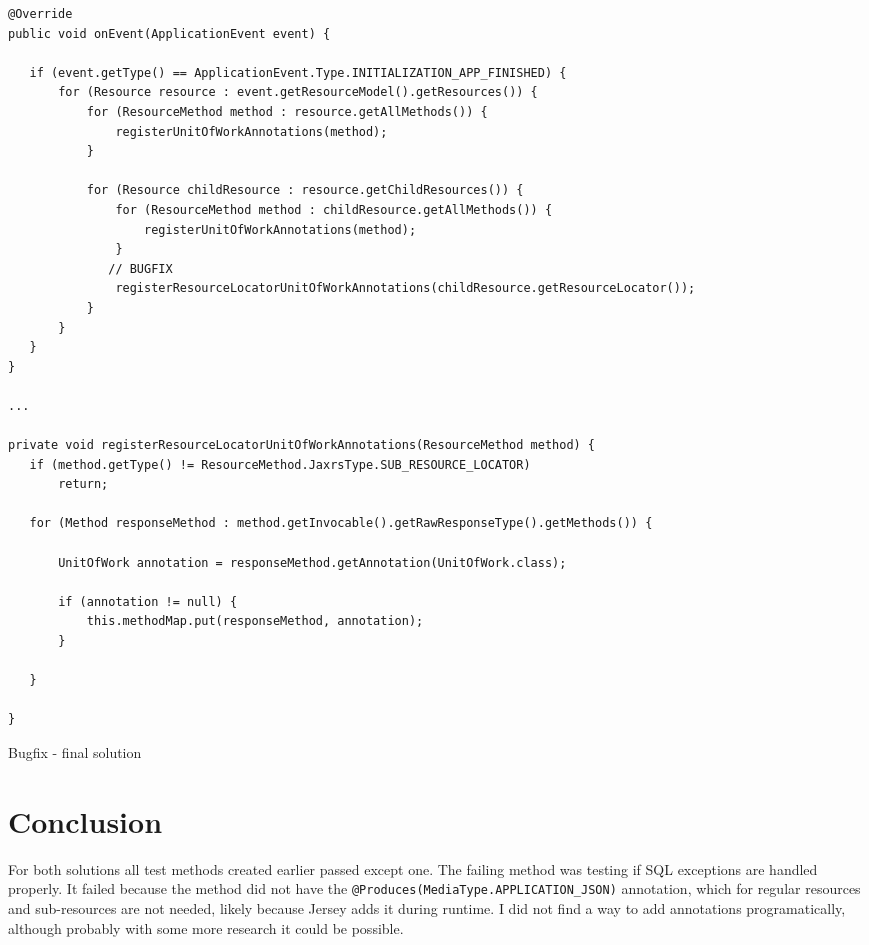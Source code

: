 \documentclass[11pt]{article}
\begin{document}
\begin{listing}
\begin{verbatim}
@Override
public void onEvent(ApplicationEvent event) {

   if (event.getType() == ApplicationEvent.Type.INITIALIZATION_APP_FINISHED) {
       for (Resource resource : event.getResourceModel().getResources()) {
           for (ResourceMethod method : resource.getAllMethods()) {
               registerUnitOfWorkAnnotations(method);
           }

           for (Resource childResource : resource.getChildResources()) {
               for (ResourceMethod method : childResource.getAllMethods()) {
                   registerUnitOfWorkAnnotations(method);
               }
              // BUGFIX
               registerResourceLocatorUnitOfWorkAnnotations(childResource.getResourceLocator());
           }
       }
   }
}

...

private void registerResourceLocatorUnitOfWorkAnnotations(ResourceMethod method) {
   if (method.getType() != ResourceMethod.JaxrsType.SUB_RESOURCE_LOCATOR)
       return;

   for (Method responseMethod : method.getInvocable().getRawResponseType().getMethods()) {

       UnitOfWork annotation = responseMethod.getAnnotation(UnitOfWork.class);

       if (annotation != null) {
           this.methodMap.put(responseMethod, annotation);
       }

   }

}
\end{verbatim}
\caption{Bugfix - final solution}
\label{lst:solution-final}
\end{listing}

\section{Conclusion}

For both solutions all test methods created earlier passed except one. The failing method was testing if SQL exceptions are handled properly. It failed because the method did not have the \texttt{@Produces(MediaType.APPLICATION_JSON)} annotation, which for regular resources and sub-resources are not needed, likely because Jersey adds it during runtime. I did not find a way to add annotations programatically, although probably with some more research it could be possible.
\end{document}
